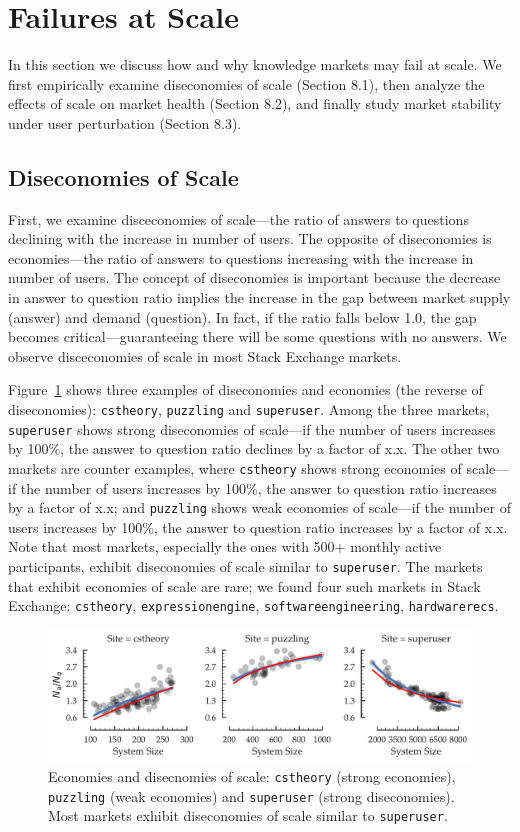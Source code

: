 \section{Failures at Scale}
In this section we discuss how and why knowledge markets may fail at scale. We first empirically examine diseconomies of scale (Section 8.1), then analyze the effects of scale on market health (Section 8.2), and finally study market stability under user perturbation (Section 8.3).

\subsection{Diseconomies of Scale}
First, we examine disceconomies of scale---the ratio of answers to questions declining with the increase in number of users. The opposite of diseconomies is economies---the ratio of answers to questions increasing with the increase in number of users. The concept of diseconomies is important because the decrease in answer to question ratio implies the increase in the gap between market supply (answer) and demand (question). In fact, if the ratio falls below 1.0, the gap becomes critical---guaranteeing there will be some questions with no answers. We observe disceconomies of scale in most Stack Exchange markets.

Figure~\ref{fig:diseconomy} shows three examples of diseconomies and economies (the reverse of diseconomies): \texttt{cstheory}, \texttt{puzzling} and \texttt{superuser}. Among the three markets, \texttt{superuser} shows strong diseconomies of scale---if the number of users increases by 100\%, the answer to question ratio declines by a factor of x.x. The other two markets are counter examples, where \texttt{cstheory} shows strong economies of scale---if the number of users increases by 100\%, the answer to question ratio increases by a factor of x.x; and \texttt{puzzling} shows weak economies of scale---if the number of users increases by 100\%, the answer to question ratio increases by a factor of x.x. Note that most markets, especially the ones with 500+ monthly active participants, exhibit diseconomies of scale similar to \texttt{superuser}. The markets that exhibit economies of scale are rare; we found four such markets in Stack Exchange: \texttt{cstheory}, \texttt{expressionengine}, \texttt{softwareengineering}, \texttt{hardwarerecs}.

\begin{figure}[hbt]
\centering
\includegraphics[scale=0.38]{Figures/Size_vs_Diseconomy.pdf}
\caption{Economies and disecnomies of scale: \texttt{cstheory} (strong economies), \texttt{puzzling} (weak economies) and \texttt{superuser} (strong diseconomies). Most markets exhibit diseconomies of scale similar to \texttt{superuser}.}
\label{fig:diseconomy}
\end{figure}

